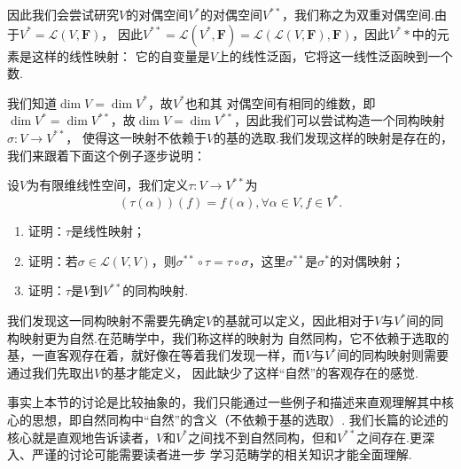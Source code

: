 因此我们会尝试研究$V$的对偶空间$V^*$的对偶空间$V^{**}$，我们称之为双重对偶空间.由于$V^*=\mathcal{L}(V,\mathbf{F})$，
因此$V^{**}=\mathcal{L}(V^*,\mathbf{F})=\mathcal{L}(\mathcal{L}(V,\mathbf{F}),\mathbf{F})$，因此$V^**$中的元素是这样的线性映射：
它的自变量是$V$上的线性泛函，它将这一线性泛函映到一个数.

我们知道$\dim V=\dim V^*$，故$V^*$也和其
对偶空间有相同的维数，即$\dim V^*=\dim V^{**}$，故$\dim V=\dim V^{**}$，因此我们可以尝试构造一个同构映射$\sigma:V\to V^{**}$，
使得这一映射不依赖于$V$的基的选取.我们发现这样的映射是存在的，我们来跟着下面这个例子逐步说明：
\begin{example}
    设$V$为有限维线性空间，我们定义$\tau:V\to V^{**}$为
    \[(\tau(\alpha))(f)=f(\alpha),\forall \alpha\in V, f\in V^*.\]
    \begin{enumerate}[label=(\arabic*)]
        \item 证明：$\tau$是线性映射；
        \item 证明：若$\sigma\in\mathcal{L}(V,V)$，则$\sigma^{**}\circ\tau=\tau\circ\sigma$，这里$\sigma^{**}$是$\sigma^*$的对偶映射；
        \item 证明：$\tau$是$V$到$V^{**}$的同构映射.
    \end{enumerate}
\end{example}
\begin{solution}

\end{solution}

我们发现这一同构映射不需要先确定$V$的基就可以定义，因此相对于$V$与$V^*$间的同构映射更为自然.在范畴学中，我们称这样的映射为
自然同构，它不依赖于选取的基，一直客观存在着，就好像在等着我们发现一样，而$V$与$V^*$间的同构映射则需要通过我们先取出$V$的基才能定义，
因此缺少了这样``自然''的客观存在的感觉.

事实上本节的讨论是比较抽象的，我们只能通过一些例子和描述来直观理解其中核心的思想，即自然同构中``自然''的含义（不依赖于基的选取）.
我们长篇的论述的核心就是直观地告诉读者，$V$和$V^*$之间找不到自然同构，但和$V^{**}$之间存在.更深入、严谨的讨论可能需要读者进一步
学习范畴学的相关知识才能全面理解.

